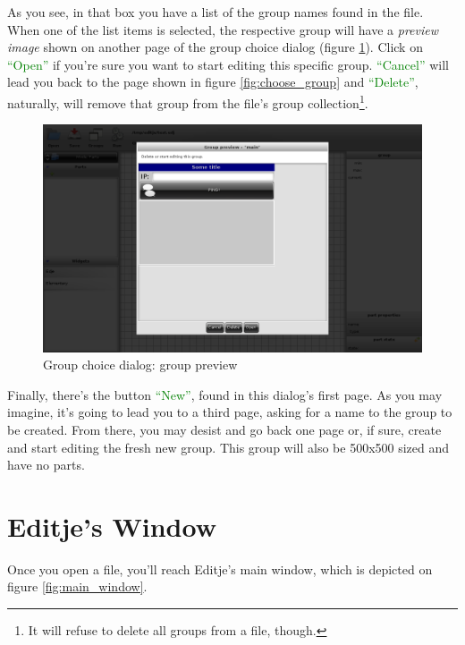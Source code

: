 \documentclass[a4paper]{profusion}
\newcommand{\GUIButton}[1]{\textcolor{green}{#1}} %
\begin{document}
As you see, in that box you have a list of the group names found in
the file. When one of the list items is selected, the respective group
will have a \emph{preview image} shown on another page of the group
choice dialog (figure \ref{fig:group_preview}). Click on
\GUIButton{``Open''} if you're sure you want to start editing this
specific group. \GUIButton{``Cancel''} will lead you back to the page
shown in figure \ref{fig:choose_group} and \GUIButton{``Delete''},
naturally, will remove that group from the file's group
collection\footnote{It will refuse to delete all groups from a file,
  though.}.

\begin{figure}[h!]
  \centering
  \includegraphics[width=1.0\textwidth]{images/group_preview.png}
  \caption{Group choice dialog: group preview}
  \label{fig:group_preview}
\end{figure}

Finally, there's the button \GUIButton{``New''}, found in this
dialog's first page. As you may imagine, it's going to lead you to a
third page, asking for a name to the group to be created. From there,
you may desist and go back one page or, if sure, create and start
editing the fresh new group. This group will also be 500x500 sized and
have no parts.

\section{Editje's Window}

Once you open a file, you'll reach Editje's main window, which is
depicted on figure \ref{fig:main_window}.
\end{document}
